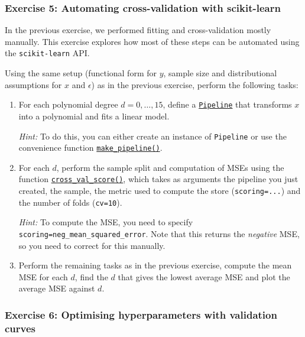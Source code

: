 \documentclass{scrartcl}
\begin{document}
    \hypertarget{exercise-5-automating-cross-validation-with-scikit-learn}{%
\subsubsection*{Exercise 5: Automating cross-validation with
scikit-learn}\label{exercise-5-automating-cross-validation-with-scikit-learn}}

In the previous exercise, we performed fitting and cross-validation
mostly manually. This exercise explores how most of these steps can be
automated using the \texttt{scikit-learn} API.

Using the same setup (functional form for \(y\), sample size and
distributional assumptions for \(x\) and \(\epsilon\)) as in the
previous exercise, perform the following tasks:

\begin{enumerate}
\def\labelenumi{\arabic{enumi}.}
\item
  For each polynomial degree \(d = 0,\dots,15\), define a
  \href{https://scikit-learn.org/stable/modules/generated/sklearn.pipeline.Pipeline.html}{\texttt{Pipeline}}
  that transforms \(x\) into a polynomial and fits a linear model.

  \emph{Hint:} To do this, you can either create an instance of
  \texttt{Pipeline} or use the convenience function
  \href{https://scikit-learn.org/stable/modules/generated/sklearn.pipeline.make_pipeline.html}{\texttt{make\_pipeline()}}.
\item
  For each \(d\), perform the sample split and computation of MSEs using
  the function
  \href{https://scikit-learn.org/stable/modules/generated/sklearn.model_selection.cross_val_score.html}{\texttt{cross\_val\_score()}},
  which takes as arguments the pipeline you just created, the sample,
  the metric used to compute the store (\texttt{scoring=...}) and the
  number of folds (\texttt{cv=10}).

  \emph{Hint:} To compute the MSE, you need to specify
  \texttt{scoring=\textquotesingle{}neg\_mean\_squared\_error\textquotesingle{}}.
  Note that this returns the \emph{negative} MSE, so you need to correct
  for this manually.
\item
  Perform the remaining tasks as in the previous exercise, \ie compute
  the mean MSE for each \(d\), find the \(d\) that gives the lowest
  average MSE and plot the average MSE against \(d\).
\end{enumerate}

    \hypertarget{exercise-6-optimising-hyperparameters-with-validation-curves}{%
\subsubsection*{Exercise 6: Optimising hyperparameters with validation
curves}\label{exercise-6-optimising-hyperparameters-with-validation-curves}}
\end{document}
